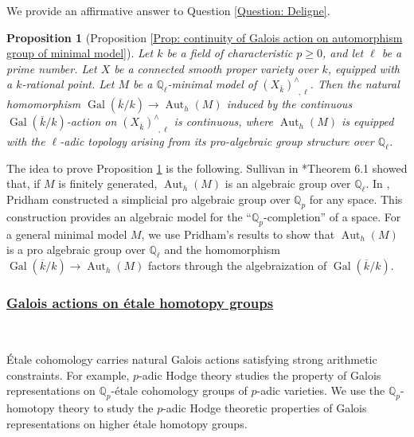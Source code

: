 \documentclass[11pt]{amsart}
\newtheorem{proposition}[theorem]{Proposition}
\theoremstyle{definition}
\numberwithin{equation}{section}
\numberwithin{equation}{section}
\newcommand\QQ{\mathbb{Q}}
\DeclareMathOperator{\Aut}{Aut}
\DeclareMathOperator{\et}{\acute{e}t}
\DeclareMathOperator{\Gal}{Gal}
\begin{document}
We provide an affirmative answer to Question \ref{Question: Deligne}.

\begin{proposition}[Proposition \ref{Prop: continuity of Galois action on automorphism group of minimal model}]\label{Intro Prop: continuity from Galois to automorphisms of minimal models}
Let $k$ be a field of characteristic $p\geq 0$, and let $\ell$ be a prime number. Let $X$ be a connected smooth proper variety over $k$, equipped with a $k$-rational point. Let $M$ be a $\QQ_{\ell}$-minimal model of $(X_{\overline{k}})^{\wedge}_{\et,\ell}$. Then the natural homomorphism $\Gal(\overline{k}/k)\rightarrow \Aut_h(M)$ induced by the continuous $\Gal(\overline{k}/k)$-action on $(X_{\overline{k}})^{\wedge}_{\et,\ell}$ is continuous, where $\Aut_h(M)$ is equipped with the $\ell$-adic topology arising from its pro-algebraic group structure over $\QQ_{\ell}$.  
\end{proposition}

The idea to prove Proposition \ref{Intro Prop: continuity from Galois to automorphisms of minimal models} is the following. Sullivan in \cite{Sullivan-rational-homotopy}*{Theorem 6.1} showed that, if $M$ is finitely generated, $\Aut_h(M)$ is an algebraic group over $\QQ_{\ell}$. In \cite{Pridham-Galois-actions-on-homotopy-groups-algebraic-varieties}, Pridham constructed a simplicial pro algebraic group over $\QQ_p$ for any space. This construction provides an algebraic model for the ``$\QQ_p$-completion'' of a space. For a general minimal model $M$, we use Pridham's results to show that $\Aut_h(M)$ is a pro algebraic group over $\QQ_{\ell}$ and the homomorphism $\Gal(\overline{k}/k)\rightarrow \Aut_h(M)$ factors through the algebraization of $\Gal(\overline{k}/k)$.

\subsubsection*{\underline{Galois actions on \'etale homotopy groups}}\,

\'Etale cohomology carries natural Galois actions satisfying strong arithmetic constraints. For example, $p$-adic Hodge theory studies the property of Galois representations on $\QQ_p$-\'etale cohomology groups of $p$-adic varieties. We use the $\QQ_p$-homotopy theory to study the $p$-adic Hodge theoretic properties of Galois representations on higher \'etale homotopy groups.
\end{document}
